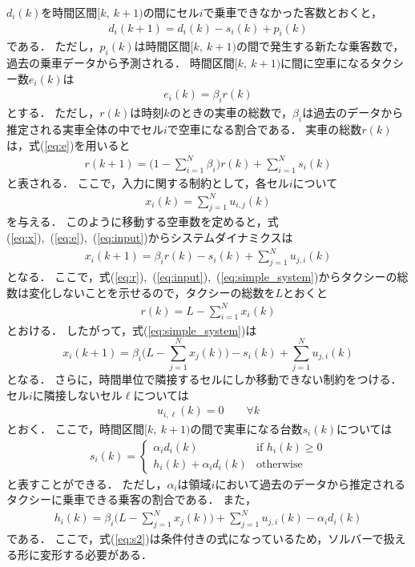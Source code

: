 \documentclass[a4j,9pt,twocolumn]{paper}
\begin{document}
$d_i(k)$を時間区間$[k,\ k+1)$の間にセル$i$で乗車できなかった客数とおくと，
\begin{align}
 d_i(k+1) = d_i(k)-s_i(k)+p_i(k)
\end{align}
である．
ただし，$p_i(k)$は時間区間$[k,\ k+1)$の間で発生する新たな乗客数で，過去の乗車データから予測される．
時間区間$[k,\ k+1)$に間に空車になるタクシー数$e_i(k)$は
\begin{align}
 e_i(k)=\beta_{i}r(k) \label{eq:e}
\end{align}
とする．
ただし，$r(k)$は時刻$k$のときの実車の総数で，$\beta_{i}$は過去のデータから推定される実車全体の中でセル$i$で空車になる割合である．
実車の総数$r(k)$は，式(\ref{eq:e})を用いると
\begin{align}
 r(k+1) = \bigg(1-\sum_{i=1}^{N}\beta_i\bigg)r(k)+\sum_{i=1}^{N}s_i(k) \label{eq:r}
\end{align}
と表される．
ここで，入力に関する制約として，各セル$i$について
\begin{align}
 x_i(k)=\sum_{j=1}^{N}u_{i,j}(k) \label{eq:input}
\end{align}
を与える．
このように移動する空車数を定めると，式(\ref{eq:x}),\ (\ref{eq:e}),\ (\ref{eq:input})からシステムダイナミクスは
\begin{align}
 x_i(k+1)=\beta_i r(k)-s_i(k)+\sum_{j=1}^{N} u_{j,i}(k) \label{eq:simple_system}
\end{align}
となる．
ここで，式(\ref{eq:r}),\ (\ref{eq:input}),\ (\ref{eq:simple_system})からタクシーの総数は変化しないことを示せるので，タクシーの総数を$L$とおくと
\begin{align}
 r(k)= L-\sum_{i=1}^{N}x_i(k) \label{eq:r_new}
\end{align}
とおける．
したがって，式(\ref{eq:simple_system})は
\begin{equation}
x_i(k+1)=\beta_i \bigg(L-\sum_{j=1}^{N} x_j(k) \bigg) -s_i(k)+\sum_{j=1}^{N} u_{j,i}(k) \label{eq:simple_system2}
\end{equation}
となる．
さらに，時間単位で隣接するセルにしか移動できない制約をつける．
セル$i$に隣接しないセル$\ell$については
\begin{align}
 u_{i, \ell}(k)=0 \qquad  \forall k \label{eq:u_seiyaku}
\end{align}
とおく．
ここで，時間区間$[k,\ k+1)$の間で実車になる台数$s_i(k)$については
\begin{align}
 s_i(k)=\left\{
\begin{array}{ll}
 \alpha_i d_i(k) & \mbox{if }h_i(k) \geq 0 \\
h_i(k)+\alpha_i d_i(k) & \mbox{otherwise}
\end{array}\right. \label{eq:s2}
\end{align}
と表すことができる．
ただし，$\alpha_i$は領域$i$において過去のデータから推定されるタクシーに乗車できる乗客の割合である．
また，
\begin{align}
 h_i(k)=\beta_i \bigg( L-\sum_{j=1}^{N}x_j(k)\bigg) +\sum_{j=1}^{N}u_{j,i}(k) -\alpha_i d_i(k) \label{eq:h}
\end{align}
である．
ここで，式(\ref{eq:s2})は条件付きの式になっているため，ソルバーで扱える形に変形する必要がある．
\end{document}

